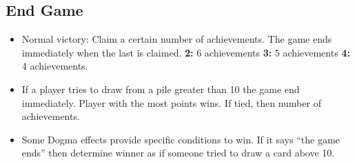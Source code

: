 \documentclass[12pt]{article}
\newenvironment{itemizeCustom}
{\begin{itemize}
  \setlength{\itemsep}{1pt}
  \setlength{\parskip}{0pt}
  \setlength{\parsep}{0pt}}
{\end{itemize}}
\begin{document}
\begin{mdframed}[style = customFrame]
\begin{multicols*}{2}
\section*{End Game}
\begin{itemizeCustom}
	\item Normal victory: Claim a certain number of achievements. The game ends immediately when the last is claimed. \textbf{2:} 6 achievements \textbf{3:} 5 achievements \textbf{4:} 4 achievements.
	\item If a player tries to draw from a pile greater than 10 the game end immediately. Player with the most points wins. If tied, then number of achievements.
	\item Some Dogma effects provide specific conditions to win. If it says ``the game ends'' then determine winner as if someone tried to draw a card above 10.
\end{itemizeCustom}

\end{multicols*}
\end{mdframed}
\end{document}
